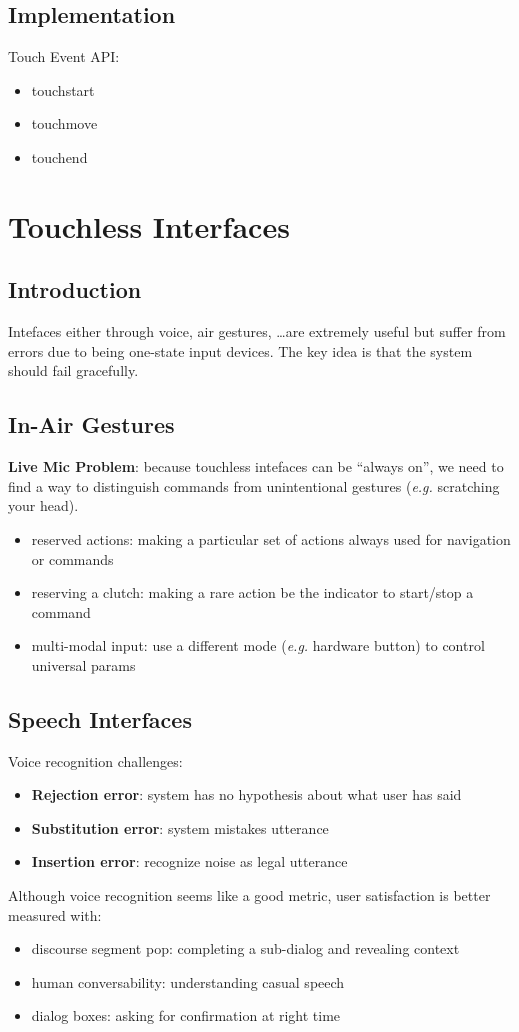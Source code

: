 \documentclass[]{article}
\theoremstyle{definition}
\begin{document}
	\subsection{Implementation}
	Touch Event API:
	\begin{itemize}
		\item touchstart
		\item touchmove
		\item touchend
	\end{itemize}


	\section{Touchless Interfaces}
	\subsection{Introduction}
	Intefaces either through voice, air gestures, \dots are extremely useful but suffer
	from errors due to being one-state input devices. The key idea is that the system should
	fail gracefully.

	\subsection{In-Air Gestures}
	\textbf{Live Mic Problem}: because touchless intefaces can be ``always on'', we need to find a way to distinguish commands from unintentional gestures (\textit{e.g.} scratching your head). 
	\begin{itemize}
		\item reserved actions: making a particular set of actions always used for navigation or commands
		\item reserving a clutch: making a rare action be the indicator to start/stop a command
		\item multi-modal input: use a different mode (\textit{e.g.} hardware button) to control universal params
	\end{itemize}

	\subsection{Speech Interfaces}
	Voice recognition challenges:
	\begin{itemize}
		\item \textbf{Rejection error}: system has no hypothesis about what user has said
		\item \textbf{Substitution error}: system mistakes utterance
		\item \textbf{Insertion error}: recognize noise as legal utterance
	\end{itemize}
	Although voice recognition seems like a good metric, user satisfaction is better measured with:
	\begin{itemize}
		\item discourse segment pop: completing a sub-dialog and revealing context
		\item human conversability: understanding casual speech
		\item dialog boxes: asking for confirmation at right time
	\end{itemize}
\end{document}
